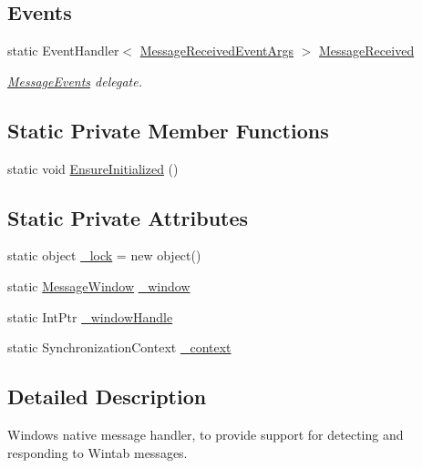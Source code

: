 \subsection*{Events}
\begin{DoxyCompactItemize}
\item 
static Event\+Handler$<$ \mbox{\hyperlink{class_wintab_d_n_1_1_message_received_event_args}{Message\+Received\+Event\+Args}} $>$ \mbox{\hyperlink{class_wintab_d_n_1_1_message_events_a0bb034056135d121fabac9184ece932d}{Message\+Received}}
\begin{DoxyCompactList}\small\item\em \mbox{\hyperlink{class_wintab_d_n_1_1_message_events}{Message\+Events}} delegate. \end{DoxyCompactList}\end{DoxyCompactItemize}
\subsection*{Static Private Member Functions}
\begin{DoxyCompactItemize}
\item 
static void \mbox{\hyperlink{class_wintab_d_n_1_1_message_events_a560e49ea1588cadcdc66548f8a7c46c7}{Ensure\+Initialized}} ()
\end{DoxyCompactItemize}
\subsection*{Static Private Attributes}
\begin{DoxyCompactItemize}
\item 
static object \mbox{\hyperlink{class_wintab_d_n_1_1_message_events_a468088e621b52930258b37349dd68b13}{\+\_\+lock}} = new object()
\item 
static \mbox{\hyperlink{class_wintab_d_n_1_1_message_events_1_1_message_window}{Message\+Window}} \mbox{\hyperlink{class_wintab_d_n_1_1_message_events_a6955650f3ae702ff52e4961595ca61c9}{\+\_\+window}}
\item 
static Int\+Ptr \mbox{\hyperlink{class_wintab_d_n_1_1_message_events_a574fbe6ab9f320153cac478583dbe5ae}{\+\_\+window\+Handle}}
\item 
static Synchronization\+Context \mbox{\hyperlink{class_wintab_d_n_1_1_message_events_af89f7b8162756a5ac35e64b25935adbd}{\+\_\+context}}
\end{DoxyCompactItemize}


\subsection{Detailed Description}
Windows native message handler, to provide support for detecting and responding to Wintab messages. 



